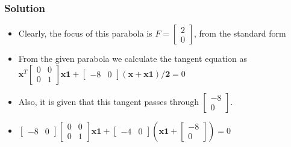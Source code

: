 \documentclass{beamer}
\begin{document}
\begin{frame}
\frametitle{Solution}
\begin{itemize}
	\item<1-> Clearly, the focus of this parabola is $F = \begin{bmatrix} 2 \\ 0
	\end{bmatrix}$, from the standard form
	\item<2-> From the given parabola we calculate the tangent equation as $\mathbf{x}^T \begin{bmatrix} 0 & 0 \\0 & 1
	\end{bmatrix} \mathbf{x1} + \begin{bmatrix} -8 & 0
	\end{bmatrix} \mathbf{(x + x1)/2} = 0$ \newline
	\newline

	\item<3-> Also, it is given that this tangent passes through $\begin{bmatrix} -8 \\ 0
	\end{bmatrix}$.
	\newline
	\newline
	
	\item<4->$ \begin{bmatrix} -8 & 0
	\end{bmatrix}\begin{bmatrix} 0 & 0 \\0 & 1
	\end{bmatrix} \mathbf{x1} + \begin{bmatrix} -4 & 0
	\end{bmatrix} (\mathbf{x1} +\begin{bmatrix} -8 \\ 0
	\end{bmatrix} ) = 0$ \newline
	\newline
\end{itemize}
\end{frame}
\end{document}
